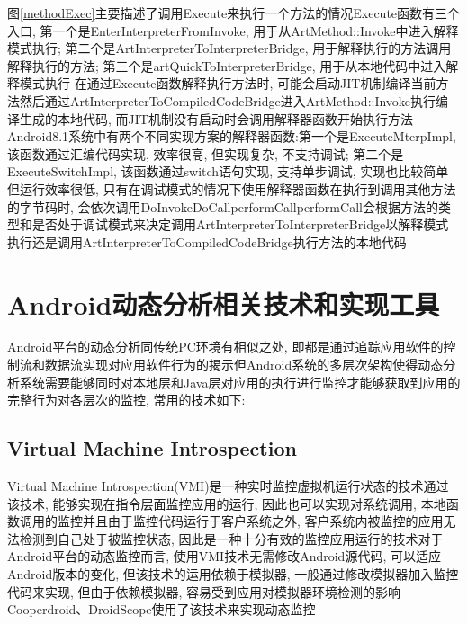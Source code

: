 图\ref{methodExec}主要描述了调用Execute来执行一个方法的情况\juhao Execute函数有三个入口, 第一个是EnterInterpreterFromInvoke, 用于从ArtMethod::Invoke中进入解释模式执行; 第二个是ArtInterpreterToInterpreterBridge, 用于解释执行的方法调用解释执行的方法; 第三个是artQuickToInterpreterBridge, 用于从本地代码中进入解释模式执行\juhao
在通过Execute函数解释执行方法时, 可能会启动JIT机制编译当前方法然后通过ArtInterpreterToCompiledCodeBridge进入ArtMethod::Invoke执行编译生成的本地代码, 而JIT机制没有启动时会调用解释器函数开始执行方法\juhao Android8.1系统中有两个不同实现方案的解释器函数:第一个是ExecuteMterpImpl, 该函数通过汇编代码实现, 效率很高, 但实现复杂, 不支持调试; 第二个是ExecuteSwitchImpl, 该函数通过switch语句实现, 支持单步调试, 实现也比较简单但运行效率很低, 只有在调试模式的情况下使用\juhao 解释器函数在执行到调用其他方法的字节码时, 会依次调用DoInvoke\dunhao DoCall\dunhao performCall\juhao performCall会根据方法的类型和是否处于调试模式来决定调用ArtInterpreterToInterpreterBridge以解释模式执行还是调用ArtInterpreterToCompiledCodeBridge执行方法的本地代码\juhao 


\section{Android动态分析相关技术和实现工具}
Android平台的动态分析同传统PC环境有相似之处, 即都是通过追踪应用软件的控制流和数据流实现对应用软件行为的揭示\juhao 但Android系统的多层次架构使得动态分析系统需要能够同时对本地层和Java层对应用的执行进行监控才能够获取到应用的完整行为\juhao 对各层次的监控, 常用的技术如下:

\subsection{Virtual Machine Introspection}
Virtual Machine Introspection(VMI)是一种实时监控虚拟机运行状态的技术\juhao 通过该技术, 能够实现在指令层面监控应用的运行, 因此也可以实现对系统调用, 本地函数调用的监控\juhao 并且由于监控代码运行于客户系统之外, 客户系统内被监控的应用无法检测到自己处于被监控状态, 因此是一种十分有效的监控应用运行的技术\juhao 对于Android平台的动态监控而言, 使用VMI技术无需修改Android源代码, 可以适应Android版本的变化, 但该技术的运用依赖于模拟器, 一般通过修改模拟器加入监控代码来实现, 但由于依赖模拟器, 容易受到应用对模拟器环境检测的影响\juhao Cooperdroid、DroidScope使用了该技术来实现动态监控\juhao

